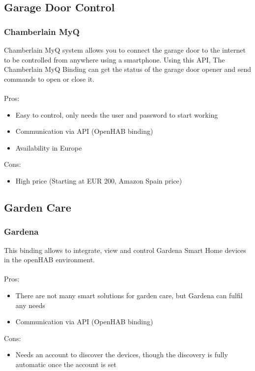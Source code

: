 \subsection{Garage Door Control}

\subsubsection{Chamberlain MyQ}
Chamberlain MyQ system allows you to connect the garage door to the internet to be controlled from anywhere using a smartphone. Using
this API, The Chamberlain MyQ Binding can get the status of the garage door opener and send commands to open or close it.\\~\\
Pros:
\begin{itemize}
	\item Easy to control, only needs the user and password to start working
	\item Communication via API (OpenHAB binding)
	\item Availability in Europe
\end{itemize}
Cons:
\begin{itemize}
	\item High price (Starting at EUR 200, Amazon Spain price)
\end{itemize}

\subsection{Garden Care}

\subsubsection{Gardena}
This binding allows to integrate, view and control Gardena Smart Home devices in the openHAB environment.\\~\\
Pros:
\begin{itemize}
	\item There are not many smart solutions for garden care, but Gardena can fulfil any needs
	\item Communication via API (OpenHAB binding)
\end{itemize}
Cons:
\begin{itemize}
	\item Needs an account to discover the devices, though the discovery is fully automatic once the account is set
\end{itemize}

